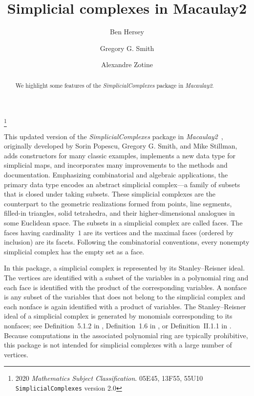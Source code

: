 \documentclass[12pt,leqno]{amsart}
\theoremstyle{definition}
\begin{document}
\vspace*{-4.5em}

\title[Simplicial Complexes]{Simplicial complexes in Macaulay2}

\author[B.~Hersey]{Ben Hersey}
\author[G.G.~Smith]{Gregory G.{} Smith} 
\author[A.~Zotine]{Alexandre Zotine}

\address{Department of Mathematics and Statistics, Queen's
  University, Kingston, Ontario, K7L 3N6
  {\normalfont\texttt{hersey.b@queensu.ca}},
  {\normalfont\texttt{ggsmith@mast.queensu.ca}},
  {\normalfont\texttt{18az45@queensu.ca}}.
}

\thanks{2020 \emph{Mathematics Subject Classification}. 05E45, 13F55,
  55U10\\
  \indent
  \texttt{SimplicialComplexes} version 2.0
}

\begin{abstract}
  We highlight some features of the \emph{SimplicialComplexes} package in
  \emph{Macaulay2}.
\end{abstract}

\maketitle

\vspace{-0.5em}

\noindent
This updated version of the \emph{SimplicialComplexes} package in
\emph{Macaulay2}~\cite{M2}, originally developed by Sorin Popescu, Gregory
G. Smith, and Mike Stillman, adds constructors for many classic examples,
implements a new data type for simplicial maps, and incorporates many
improvements to the methods and documentation.  Emphasizing combinatorial and
algebraic applications, the primary data type encodes an abstract simplicial
complex---a family of subsets that is closed under taking subsets.  These
simplicial complexes are the counterpart to the geometric realizations formed
from points, line segments, filled-in triangles, solid tetrahedra, and their
higher-dimensional analogues in some Euclidean space.  The subsets in a
simplicial complex are called faces. The faces having cardinality~$1$ are its
vertices and the maximal faces (ordered by inclusion) are its facets.
Following the combinatorial conventions, every nonempty simplicial complex has
the empty set as a face.

In this package, a simplicial complex is represented by its Stanley--Reisner
ideal. The vertices are identified with a subset of the variables in a
polynomial ring and each face is identified with the product of the
corresponding variables.  A nonface is any subset of the variables that does
not belong to the simplicial complex and each nonface is again identified with
a product of variables. The Stanley--Reisner ideal of a simplicial complex is
generated by monomials corresponding to its nonfaces; see Definition~5.1.2 in
\cite{BH}, Definition~1.6 in \cite{MS}, or Definition~II.1.1 in
\cite{Stanley}. Because computations in the associated polynomial ring are
typically prohibitive, this package is not intended for simplicial complexes
with a large number of vertices.
\end{document}
